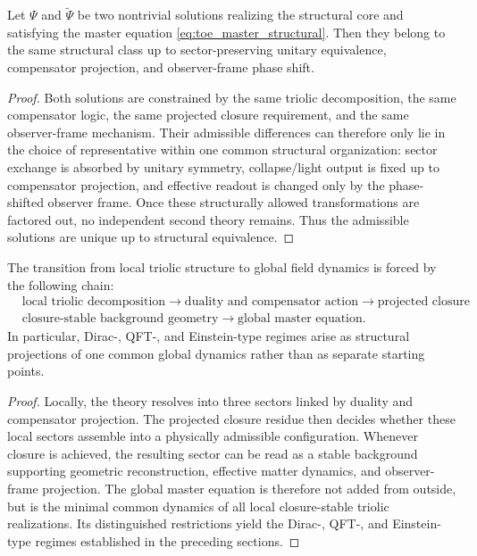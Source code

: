 \begin{theorem}
\label{thm:structural-uniqueness}
Let $\Psi$ and $\widetilde\Psi$ be two nontrivial solutions realizing the
structural core and satisfying the master equation
\eqref{eq:toe_master_structural}. Then they belong to the same structural
class up to sector-preserving unitary equivalence, compensator projection, and
observer-frame phase shift.
\end{theorem}

\begin{proof}
Both solutions are constrained by the same triolic decomposition, the same
compensator logic, the same projected closure requirement, and the same
observer-frame mechanism. Their admissible differences can therefore only lie
in the choice of representative within one common structural organization:
sector exchange is absorbed by unitary symmetry, collapse/light output is fixed
up to compensator projection, and effective readout is changed only by the
phase-shifted observer frame. Once these structurally allowed transformations
are factored out, no independent second theory remains. Thus the admissible
solutions are unique up to structural equivalence.
\end{proof}

\begin{proposition}
\label{prop:local-to-global}
The transition from local triolic structure to global field dynamics is forced
by the following chain:
\[
\begin{aligned}
&\text{local triolic decomposition}
  \longrightarrow \text{duality and compensator action}
  \longrightarrow \text{projected closure}\\
&\text{closure-stable background geometry}
  \longrightarrow \text{global master equation}.
\end{aligned}
\]
In particular, Dirac-, QFT-, and Einstein-type regimes arise as structural
projections of one common global dynamics rather than as separate starting
points.
\end{proposition}

\begin{proof}
Locally, the theory resolves into three sectors linked by duality and
compensator projection. The projected closure residue then decides whether
these local sectors assemble into a physically admissible configuration.
Whenever closure is achieved, the resulting sector can be read as a stable
background supporting geometric reconstruction, effective matter dynamics, and
observer-frame projection. The global master equation is therefore not added
from outside, but is the minimal common dynamics of all local closure-stable
triolic realizations. Its distinguished restrictions yield the Dirac-, QFT-,
and Einstein-type regimes established in the preceding sections.
\end{proof}

